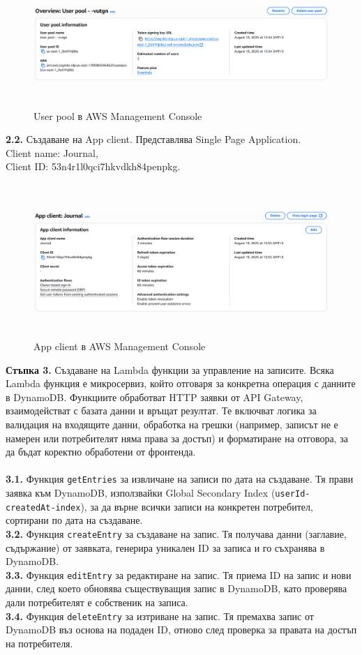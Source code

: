 \documentclass[12pt]{article}
\begin{document}
 \begin{figure}[H]
\centering
    \includegraphics[scale=0.4]{user_pool.png}
  \caption{User pool в AWS Management Console}
\end{figure}

\noindent\textbf{2.2.} Създаване на App client. Представлява Single Page Application.\\
Client name: Journal,\\
Client ID: 53n4r1l0qci7hkvdkh84penpkg.\\

 \begin{figure}[H]
\centering
    \includegraphics[scale=0.4]{app_client.png}
  \caption{App client в AWS Management Console}
\end{figure}

\medskip

\noindent\textbf{Стъпка 3.} Създаване на Lambda функции за управление на записите.
Всяка Lambda функция е микросервиз, който отговаря за конкретна операция с данните в DynamoDB. Функциите обработват HTTP заявки от API Gateway, взаимодействат с базата данни и връщат резултат. Те включват логика за валидация на входящите данни, обработка на грешки (например, записът не е намерен или потребителят няма права за достъп) и форматиране на отговора, за да бъдат коректно обработени от фронтенда.
\\
\\
\noindent\textbf{3.1.} Функция \texttt{getEntries} за извличане на записи по дата на създаване. Тя прави заявка към DynamoDB, използвайки Global Secondary Index (\texttt{userId-createdAt-index}), за да върне всички записи на конкретен потребител, сортирани по дата на създаване.\\
\noindent\textbf{3.2.} Функция \texttt{createEntry} за създаване на запис. Тя получава данни (заглавие, съдържание) от заявката, генерира уникален ID за записа и го съхранява в DynamoDB.\\
\noindent\textbf{3.3.} Функция \texttt{editEntry} за редактиране на запис. Тя приема ID на запис и нови данни, след което обновява съществуващия запис в DynamoDB, като проверява дали потребителят е собственик на записа.\\
\noindent\textbf{3.4.} Функция \texttt{deleteEntry} за изтриване на запис. Тя премахва запис от DynamoDB въз основа на подаден ID, отново след проверка за правата на достъп на потребителя.\\
\end{document}
